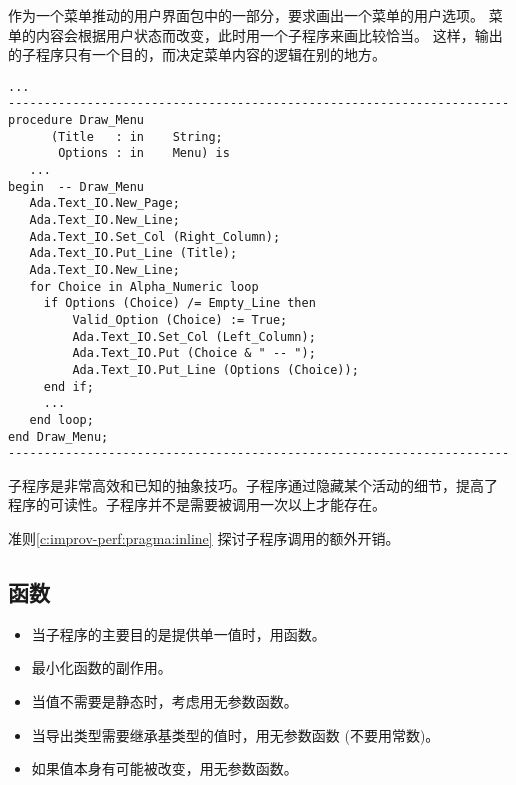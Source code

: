 \begin{blockindent}
作为一个菜单推动的用户界面包中的一部分，要求画出一个菜单的用户选项。
菜单的内容会根据用户状态而改变，此时用一个子程序来画比较恰当。
这样，输出的子程序只有一个目的，而决定菜单内容的逻辑在别的地方。

\begin{lstlisting}
...
----------------------------------------------------------------------
procedure Draw_Menu
      (Title   : in    String;
       Options : in    Menu) is
   ...
begin  -- Draw_Menu
   Ada.Text_IO.New_Page;
   Ada.Text_IO.New_Line;
   Ada.Text_IO.Set_Col (Right_Column);
   Ada.Text_IO.Put_Line (Title);
   Ada.Text_IO.New_Line;
   for Choice in Alpha_Numeric loop
     if Options (Choice) /= Empty_Line then
         Valid_Option (Choice) := True;
         Ada.Text_IO.Set_Col (Left_Column);
         Ada.Text_IO.Put (Choice & " -- ");
         Ada.Text_IO.Put_Line (Options (Choice));
     end if;
     ...
   end loop;
end Draw_Menu;
----------------------------------------------------------------------
\end{lstlisting}
\end{blockindent}

\begin{blockindent}
子程序是非常高效和已知的抽象技巧。子程序通过隐藏某个活动的细节，提高了
程序的可读性。子程序并不是需要被调用一次以上才能存在。
\end{blockindent}

\begin{blockindent}
准则\ref{c:improv-perf:pragma:inline} 探讨子程序调用的额外开销。
\end{blockindent}

\subsection{函数}
\begin{itemize}
\item 当子程序的主要目的是提供单一值时，用函数。
\item 最小化函数的副作用。
\item 当值不需要是静态时，考虑用无参数函数。
\item 当导出类型需要继承基类型的值时，用无参数函数 (不要用常数)。
\item 如果值本身有可能被改变，用无参数函数。
\end{itemize}

